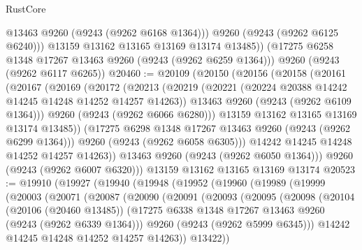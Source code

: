 \begin{lexlean}{RustCore}
\begin{coremodule}
            @13463
            @9260
            (@9243 (@9262 @6168 @1364)))
          @9260
          (@9243 (@9262 @6125 @6240)))
        @13159
        @13162
        @13165
        @13169
        @13174
        @13485))
    (@17275 @6258 @1348 @17267 @13463 @9260 (@9243 (@9262 @6259 @1364)))
    @9260
    (@9243 (@9262 @6117 @6265))
@20460 := @20109
    (@20150
      (@20156
        (@20158
          (@20161
            (@20167
              (@20169
                (@20172
                  (@20213
                    (@20219
                      (@20221 (@20224 @20388 @14242 @14245 @14248 @14252 @14257 @14263))
                      @13463
                      @9260
                      (@9243 (@9262 @6109 @1364)))
                    @9260
                    (@9243 (@9262 @6066 @6280)))
                  @13159
                  @13162
                  @13165
                  @13169
                  @13174
                  @13485))
              (@17275 @6298 @1348 @17267 @13463 @9260 (@9243 (@9262 @6299 @1364)))
              @9260
              (@9243 (@9262 @6058 @6305)))
            @14242
            @14245
            @14248
            @14252
            @14257
            @14263))
        @13463
        @9260
        (@9243 (@9262 @6050 @1364)))
      @9260
      (@9243 (@9262 @6007 @6320)))
    @13159
    @13162
    @13165
    @13169
    @13174
@20523 := @19910
    (@19927
      (@19940
        (@19948
          (@19952
            (@19960
              (@19989
                (@19999
                  (@20003
                    (@20071
                      (@20087
                        (@20090
                          (@20091
                            (@20093
                              (@20095
                                (@20098
                                  (@20104
                                    (@20106 (@20460 @13485))
                                    (@17275
                                      @6338
                                      @1348
                                      @17267
                                      @13463
                                      @9260
                                      (@9243 (@9262 @6339 @1364)))
                                    @9260
                                    (@9243 (@9262 @5999 @6345)))
                                  @14242
                                  @14245
                                  @14248
                                  @14252
                                  @14257
                                  @14263))
                              @13422))

\end{coremodule}
\end{lexlean}

